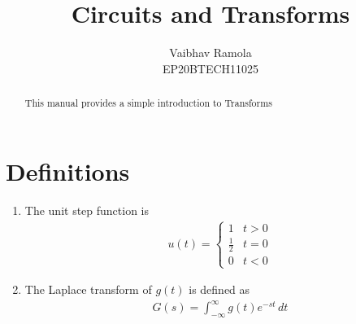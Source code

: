 \documentclass[journal,12pt,twocolumn]{IEEEtran}
\renewcommand\thesection{\arabic{section}}
\begin{document}
\let\StandardTheFigure\thefigure
\renewcommand{\thefigure}{\theproblem}
\renewcommand{\thefigure}{\arabic{section}.\arabic{figure}}
\makeatletter
{}
\makeatother


\def\putbox#1#2#3{\makebox[0in][l]{\makebox[#1][l]{}\raisebox{\baselineskip}[0in][0in]{\raisebox{#2}[0in][0in]{#3}}}}
     \def\rightbox#1{\makebox[0in][r]{#1}}
     \def\centbox#1{\makebox[0in]{#1}}
     \def\topbox#1{\raisebox{-\baselineskip}[0in][0in]{#1}}
     \def\midbox#1{\raisebox{-0.5\baselineskip}[0in][0in]{#1}}

\vspace{3cm}

\title{ 
Circuits and Transforms
}

\author{Vaibhav Ramola\\EP20BTECH11025}

\maketitle


\tableofcontents


\renewcommand{\thefigure}{\theenumi}
\renewcommand{\thetable}{\theenumi}



\bigskip

\begin{abstract}
This manual provides a simple introduction to Transforms
\end{abstract}

\section{Definitions}
\begin{enumerate}[label=\arabic*.,ref=\thesection.\theenumi]
\item The unit step function is 
\begin{align}
u(t) =
\begin{cases}
1 & t > 0
\\
	\frac{1}{2} & t = 0
\\
0 & t < 0
\end{cases}
\end{align}
\item The Laplace transform of $g(t)$ is defined as 
\begin{align}
	G(s) = \int_{-\infty}^{\infty} g(t) e^{-st}\, dt
\end{align}
 \end{enumerate}
\end{document}
